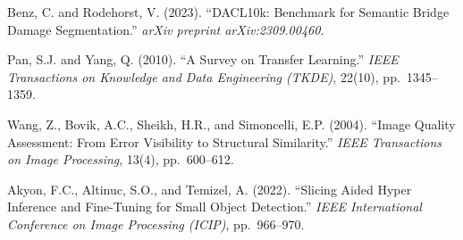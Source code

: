 \documentclass[12pt,a4paper]{article}
\begin{document}
\begin{enumerate}[leftmargin=*, label={[\arabic*]}]
  \item Benz, C. and Rodehorst, V. (2023). ``DACL10k: Benchmark for Semantic Bridge Damage Segmentation.'' \textit{arXiv preprint arXiv:2309.00460}.

  \item Pan, S.J. and Yang, Q. (2010). ``A Survey on Transfer Learning.'' \textit{IEEE Transactions on Knowledge and Data Engineering (TKDE)}, 22(10), pp.\ 1345--1359.

  \item Wang, Z., Bovik, A.C., Sheikh, H.R., and Simoncelli, E.P. (2004). ``Image Quality Assessment: From Error Visibility to Structural Similarity.'' \textit{IEEE Transactions on Image Processing}, 13(4), pp.\ 600--612.

  \item Akyon, F.C., Altinuc, S.O., and Temizel, A. (2022). ``Slicing Aided Hyper Inference and Fine-Tuning for Small Object Detection.'' \textit{IEEE International Conference on Image Processing (ICIP)}, pp.\ 966--970.

\end{enumerate}
\end{document}
